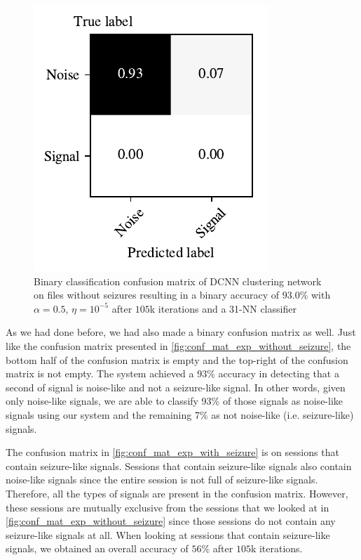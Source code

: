 \begin{figure}[!ht]
	\centering
	\includegraphics[width=0.425\linewidth]{pictures/conf_mat_exp_without_seizure_pooled.pdf}
	\caption[Binary confusion matrix on sessions without seizure-like signals]{Binary classification confusion matrix of DCNN clustering network on files without seizures resulting in a binary accuracy of $93.0\%$ with $\alpha = 0.5$, $\eta = 10^{-5}$ after $105$k iterations and a 31-NN classifier}\label{fig:conf_mat_exp_without_seizure_pooled}  
\end{figure}

As we had done before, we had also made a binary confusion matrix as well. Just like the confusion matrix presented in \cref{fig:conf_mat_exp_without_seizure}, the bottom half of the confusion matrix is empty and the top-right of the confusion matrix is not empty. The system achieved a $93\%$ accuracy in detecting that a second of signal is noise-like and not a seizure-like signal. In other words, given only noise-like signals, we are able to classify 93\% of those signals as noise-like signals using our system and the remaining 7\% as not noise-like (i.e. seizure-like) signals. 

The confusion matrix in \cref{fig:conf_mat_exp_with_seizure} is on sessions that contain seizure-like signals. Sessions that contain seizure-like signals also contain noise-like signals since the entire session is not full of seizure-like signals. Therefore, all the types of signals are present in the confusion matrix. However, these sessions are mutually exclusive from the sessions that we looked at in \cref{fig:conf_mat_exp_without_seizure} since those sessions do not contain any seizure-like signals at all. When looking at sessions that contain seizure-like signals, we obtained an overall accuracy of $56\%$ after $105$k iterations.

